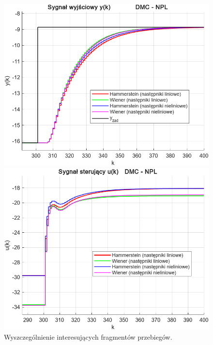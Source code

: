 \documentclass[a4paper,titlepage,11pt,floatssmall]{mwrep}
\begin{document}
\begin{figure}[p]
\begin{minipage}{0.495\linewidth}
    \centering
    \includegraphics[width=\linewidth]{pictures/DMC_npl_y_zoom}
\end{minipage}
\hfill
\begin{minipage}{0.495\linewidth}
    \centering
    \includegraphics[width=\linewidth]{pictures/DMC_npl_u_zoom}
\end{minipage}
\caption{Wyszczególnienie interesujących fragmentów przebiegów.}
\end{figure}

\end{document}
